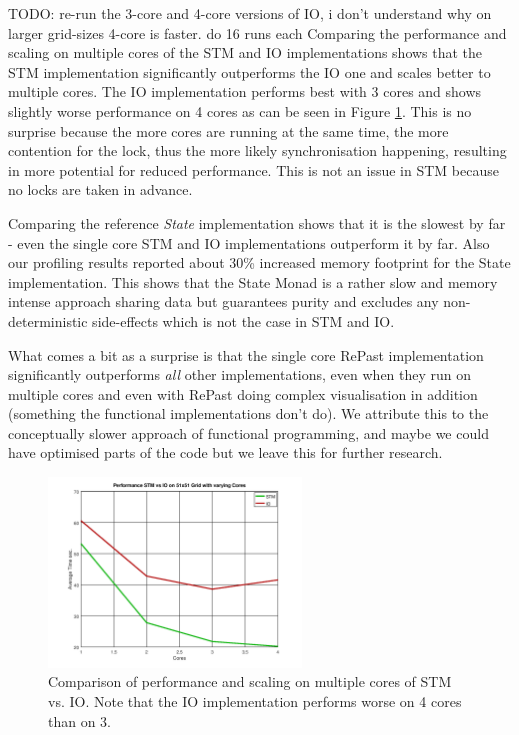 TODO: re-run the 3-core and 4-core versions of IO, i don't understand why on larger grid-sizes 4-core is faster. do 16 runs each
Comparing the performance and scaling on multiple cores of the STM and IO implementations shows that the STM implementation significantly outperforms the IO one and scales better to multiple cores. The IO implementation performs best with 3 cores and shows slightly worse performance on 4 cores as can be seen in Figure \ref{fig:core_duration_stm_io}. This is no surprise because the more cores are running at the same time, the more contention for the lock, thus the more likely synchronisation happening, resulting in more potential for reduced performance. This is not an issue in STM because no locks are taken in advance. 

Comparing the reference \textit{State} implementation shows that it is the slowest by far - even the single core STM and IO implementations outperform it by far. Also our profiling results reported about 30\% increased memory footprint for the State implementation. This shows that the State Monad is a rather slow and memory intense approach sharing data but guarantees purity and excludes any non-deterministic side-effects which is not the case in STM and IO.

What comes a bit as a surprise is that the single core RePast implementation significantly outperforms \textit{all} other implementations, even when they run on multiple cores and even with RePast doing complex visualisation in addition (something the functional implementations don't do). We attribute this to the conceptually slower approach of functional programming, and maybe we could have optimised parts of the code but we leave this for further research.

\begin{figure}
	\centering
	\includegraphics[width=0.6\textwidth, angle=0]{./fig/core_duration_stm_io.png}
	\caption{Comparison of performance and scaling on multiple cores of STM vs. IO. Note that the IO implementation performs worse on 4 cores than on 3.}
	\label{fig:core_duration_stm_io}
\end{figure}


